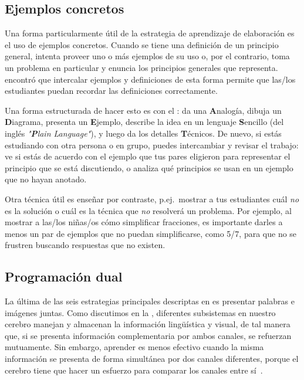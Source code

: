 \subsection*{Ejemplos concretos}

Una forma particularmente útil de la estrategia de aprendizaje de elaboración es el uso de ejemplos concretos.
Cuando se tiene una definición de un principio general,
intenta proveer uno o más ejemplos de su uso
o, por el contrario, toma un problema en particular y enuncia los principios generales que representa.
\cite{Raws2014} encontró que intercalar ejemplos y definiciones de esta forma
permite que las/los estudiantes puedan recordar las definiciones correctamente.

Una forma estructurada de hacer esto es con
el :
da una \textbf{A}nalogía,
dibuja un \textbf{D}iagrama,
presenta un \textbf{E}jemplo,
describe la idea en un lenguaje \textbf{S}encillo (del inglés \emph{"\textbf{P}lain Language"}),
y luego da los detalles \textbf{T}écnicos.
De nuevo,
si estás estudiando con otra persona o en grupo,
puedes intercambiar y revisar el trabajo:
ve si estás de acuerdo con el ejemplo que tus pares eligieron para representar
el principio que se está discutiendo,
o analiza qué principios se usan en un ejemplo que no hayan anotado.

Otra técnica útil es enseñar por contraste,
p.ej.\ mostrar a tus estudiantes cuál \emph{no} es la solución
o cuál es la técnica que \emph{no} resolverá un problema.
Por ejemplo,
al mostrar a las/los niñas/os cómo simplificar fracciones,
es importante darles a menos un par de ejemplos que no puedan simplificarse, como 5/7,
para que no se frustren buscando respuestas que no existen.

\subsection*{Programación dual}

La última de las seis estrategias principales
descriptas en 
es presentar palabras e imágenes juntas.
Como discutimos en la ,
diferentes subsistemas en nuestro cerebro manejan y almacenan la información lingüística y visual,
de tal manera que, si se presenta información complementaria por ambos canales,
se refuerzan mutuamente.
Sin embargo,
aprender es menos efectivo cuando la misma información se presenta de forma simultánea por dos canales diferentes,
porque el cerebro tiene que hacer un esfuerzo para comparar los canales entre sí~\cite{Maye2003}.

